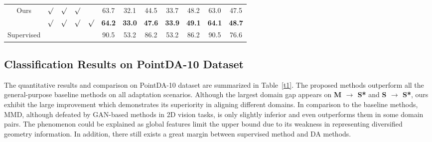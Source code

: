 \documentclass{article}
\begin{document}
\begin{table*}[t]
\begin{center}
{\begin{threeparttable}
\begin{tabular}{ccccc ccccc cc}
\multicolumn{1}{c}{Ours} &{$\surd$}  &\multicolumn{1}{c}{$\surd$}  &\multicolumn{1}{c}{$\surd$} &\multicolumn{1}{c}{} &\multicolumn{1}{c}{63.7} &\multicolumn{1}{c}{32.1} &\multicolumn{1}{c}{44.5}  &\multicolumn{1}{c}{33.7} &\multicolumn{1}{c}{48.2} &\multicolumn{1}{c}{63.0}  &\multicolumn{1}{c}{47.5}\\
\multicolumn{1}{c}{ } &{$\surd$}  &\multicolumn{1}{c}{$\surd$}  &\multicolumn{1}{c}{$\surd$} &\multicolumn{1}{c}{$\surd$} &\multicolumn{1}{c}{\textbf{64.2}} &\multicolumn{1}{c}{\textbf{33.0}} &\multicolumn{1}{c}{\textbf{47.6}}  &\multicolumn{1}{c}{\textbf{33.9}} &\multicolumn{1}{c}{\textbf{49.1}} &\multicolumn{1}{c}{\textbf{64.1}}  &\multicolumn{1}{c}{\textbf{48.7}}\\
\toprule
\multicolumn{1}{c}{Supervised} &{}  &\multicolumn{1}{c}{}  &\multicolumn{1}{c}{} &\multicolumn{1}{c}{} &\multicolumn{1}{c}{90.5} &\multicolumn{1}{c}{53.2} &\multicolumn{1}{c}{86.2}  &\multicolumn{1}{c}{53.2} &\multicolumn{1}{c}{86.2} &\multicolumn{1}{c}{90.5}  &\multicolumn{1}{c}{76.6}\\
\bottomrule  \end{tabular}
\renewcommand{\labelitemi}{}
\end{threeparttable}
}
\end{center}

\end{table*}

\subsection{Classification Results on PointDA-10 Dataset}

The quantitative results and comparison on PointDA-10 dataset are summarized in Table~\ref{t1}. The proposed methods outperform all the general-purpose baseline methods on all adaptation scenarios. Although the largest domain gap appears on \textbf{M $\rightarrow$ S*} and \textbf{S $\rightarrow$ S*}, ours exhibit the large improvement which demonstrates its superiority in aligning different domains. In comparison to the baseline methods, MMD, although defeated by GAN-based methods in 2D vision tasks, is only slightly inferior and even outperforms them in some domain pairs. The phenomenon could be explained as global features limit the upper bound due to its weakness in representing diversified geometry information. In addition, there still exists a great margin between supervised method and DA methods.
\end{document}
